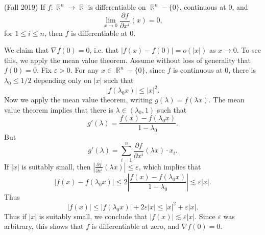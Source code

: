 \documentclass{exam}
\DeclareMathOperator{\RR}{\mathbb{R}}
\theoremstyle{problemstyle}
\newcommand{\1}[1]{\textbf{1}_{\left[#1\right]}} %
\begin{document}
\begin{questions}
\question (Fall 2019) If $f: \RR^n \to \RR$ is differentiable on $\RR^n - \{ 0 \}$, continuous at 0, and
%
\[ \lim_{x \to 0} \frac{\partial f}{\partial x^i}(x) = 0, \]
%
for $1 \leq i \leq n$, then $f$ is differentiable at 0.
\begin{solution}
	We claim that $\nabla f(0) = 0$, i.e. that $|f(x) - f(0)| = o(|x|)$ as $x \to 0$. To see this, we apply the mean value theorem. Assume without loss of generality that $f(0) = 0$. Fix $\varepsilon > 0$. For any $x \in \RR^n - \{ 0 \}$, since $f$ is continuous at $0$, there is $\lambda_0 \leq 1/2$ depending only on $|x|$ such that
	\[ |f(\lambda_0 x)| \leq |x|^2. \]
	Now we apply the mean value theorem, writing $g(\lambda) = f(\lambda x)$. The mean value theorem implies that there is $\lambda \in (\lambda_0, 1)$ such that
	\[ g'(\lambda) = \frac{f(x) - f(\lambda_0 x)}{1 - \lambda_0}. \]
	But
	\[ g'(\lambda) = \sum_{i = 1}^n \frac{\partial f}{\partial x^i}(\lambda x) \cdot x_i. \]
	If $|x|$ is suitably small, then $|\frac{\partial f}{\partial x^i}(\lambda x)| \leq \varepsilon$, which implies that
	\[ |f(x) - f(\lambda_0 x)| \leq 2 \left| \frac{f(x) - f(\lambda_0 x)}{1 - \lambda_0} \right| \lesssim \varepsilon |x|. \]
	Thus
	\[ |f(x)| \leq |f(\lambda_0 x)| + 2 \varepsilon |x| \leq |x|^2 + \varepsilon |x|. \]
	Thus if $|x|$ is suitably small, we conclude that $|f(x)| \lesssim \varepsilon |x|$. Since $\varepsilon$ was arbitrary, this shows that $f$ is differentiable at zero, and $\nabla f(0) = 0$.
\end{solution}





\end{questions}
\end{document}
